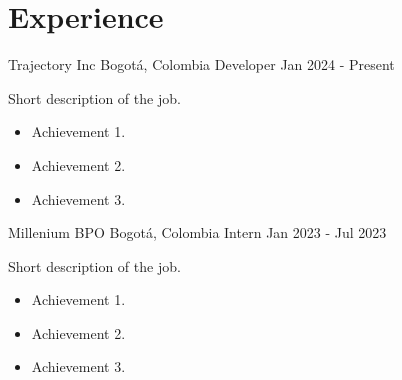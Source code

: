 
\section*{Experience}
\begin{entrylist}
    \entry
    {Trajectory Inc}
    {Bogotá, Colombia}
    {Developer}
    {Jan 2024 - Present}
    {Short description of the job.
        \begin{itemize}
            \item Achievement 1.
            \item Achievement 2.
            \item Achievement 3.
        \end{itemize}
    }

    \entry
    {Millenium BPO}
    {Bogotá, Colombia}
    {Intern}
    {Jan 2023 - Jul 2023}
    {Short description of the job.
        \begin{itemize}
            \item Achievement 1.
            \item Achievement 2.
            \item Achievement 3.
        \end{itemize}
    }
\end{entrylist}



